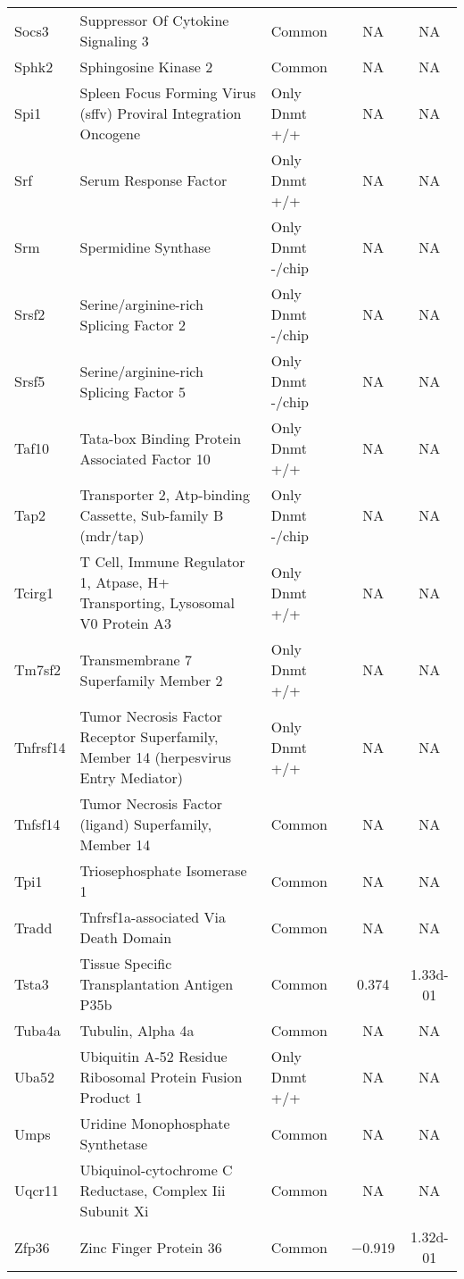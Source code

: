 {\begin{longtable}[l]{>{\raggedright}p{2.5cm}>{\raggedright}p{6cm}lcc}
Socs3	& Suppressor Of Cytokine Signaling 3	& Common	& NA	& NA\\ 
Sphk2	& Sphingosine Kinase 2	& Common	& NA	& NA\\ 
Spi1	& Spleen Focus Forming Virus (sffv) Proviral Integration Oncogene	& Only Dnmt +/+	& NA	& NA\\ 
Srf	& Serum Response Factor	& Only Dnmt +/+	& NA	& NA\\ 
Srm	& Spermidine Synthase	& Only Dnmt -/chip	& NA	& NA\\ 
Srsf2	& Serine/arginine-rich Splicing Factor 2	& Only Dnmt -/chip	& NA	& NA\\ 
Srsf5	& Serine/arginine-rich Splicing Factor 5	& Only Dnmt -/chip	& NA	& NA\\ 
Taf10	& Tata-box Binding Protein Associated Factor 10	& Only Dnmt +/+	& NA	& NA\\ 
Tap2	& Transporter 2, Atp-binding Cassette, Sub-family B (mdr/tap)	& Only Dnmt -/chip	& NA	& NA\\ 
Tcirg1	& T Cell, Immune Regulator 1, Atpase, H+ Transporting, Lysosomal V0 Protein A3	& Only Dnmt +/+	& NA	& NA\\ 
Tm7sf2	& Transmembrane 7 Superfamily Member 2	& Only Dnmt +/+	& NA	& NA\\ 
Tnfrsf14	& Tumor Necrosis Factor Receptor Superfamily, Member 14 (herpesvirus Entry Mediator)	& Only Dnmt +/+	& NA	& NA\\ 
Tnfsf14	& Tumor Necrosis Factor (ligand) Superfamily, Member 14	& Common	& NA	& NA\\ 
Tpi1	& Triosephosphate Isomerase 1	& Common	& NA	& NA\\ 
Tradd	& Tnfrsf1a-associated Via Death Domain	& Common	& NA	& NA\\ 
Tsta3	& Tissue Specific Transplantation Antigen P35b	& Common	& \num{ 0.374}	& \num{1.33d-01}\\ 
Tuba4a	& Tubulin, Alpha 4a	& Common	& NA	& NA\\ 
Uba52	& Ubiquitin A-52 Residue Ribosomal Protein Fusion Product 1	& Only Dnmt +/+	& NA	& NA\\ 
Umps	& Uridine Monophosphate Synthetase	& Common	& NA	& NA\\ 
Uqcr11	& Ubiquinol-cytochrome C Reductase, Complex Iii Subunit Xi	& Common	& NA	& NA\\ 
Zfp36	& Zinc Finger Protein 36	& Common	& \num{-0.919}	& \num{1.32d-01}\\ 
	\end{longtable}
}
